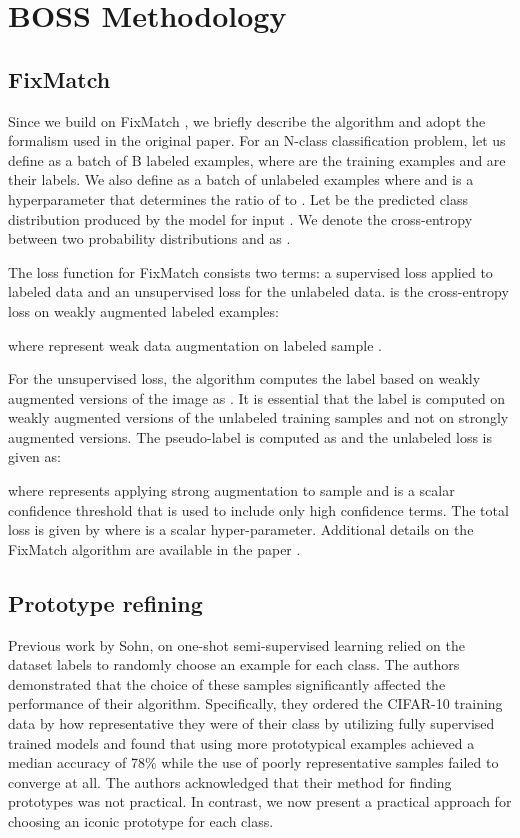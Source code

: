 \documentclass[final]{cvpr}
\newcommand{\OSSSL}{one-shot semi-supervised learning }
\newcommand{\FM}{FixMatch }
\begin{document}
\section{BOSS Methodology}
\label{sec:BOSS}

\subsection{FixMatch}
\label{sec:fixmatch}

Since we build on FixMatch \cite{sohn2020fixmatch}, we briefly describe the algorithm and adopt the formalism used in the original paper.
For an N-class classification problem, let us define  as a batch of B labeled examples, where  are the training examples and  are their labels. 
We also define  as a batch of  unlabeled examples where  and  is a hyperparameter that determines the ratio of  to . 
Let  be the predicted class distribution produced by the model for input . 
We denote the cross-entropy between two probability distributions  and  as . 

The loss function for FixMatch consists two terms: a supervised loss  applied to labeled data and an unsupervised loss  for the unlabeled data. 
 is the cross-entropy loss on weakly augmented labeled examples:

where  represent weak data augmentation on labeled sample .

For the unsupervised loss, the algorithm computes the label based on weakly augmented versions of the image as .
It is essential that the label is computed on weakly augmented versions of the unlabeled training samples and not on strongly augmented versions.
The pseudo-label is computed as  and the unlabeled loss is given as:

where  represents applying strong augmentation to sample  and  is a scalar confidence threshold that is used to include only high confidence terms.
The total loss is given by  where  is a scalar hyper-parameter.
Additional details on the \FM algorithm are available in the paper \cite{sohn2020fixmatch}.

\subsection{Prototype refining}
\label{sec:refining}

Previous work by Sohn, \etal \cite{sohn2020fixmatch} on \OSSSL relied on the dataset labels to randomly choose an example for each class.
The authors demonstrated that the choice of these samples significantly affected the performance of their algorithm.
Specifically, they ordered the CIFAR-10 training data by how representative they were of their class by utilizing fully supervised trained models and found that using more prototypical examples achieved a median accuracy of 78\% while the use of poorly representative samples failed to converge at all.
The authors acknowledged that their method for finding prototypes was not practical.
In contrast, we now present a practical approach for choosing an iconic prototype for each class.
\end{document}
